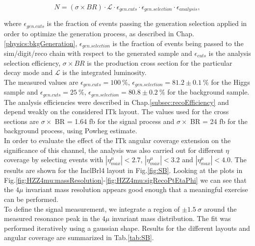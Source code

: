 \documentclass[a4paper,twoside,12pt]{book}
\begin{document}
\begin{equation*}
N = (\sigma \times BR)\cdot \mathcal{L}\cdot \epsilon_{gen. cuts}\cdot \epsilon_{gen. selection} \cdot \epsilon_{analysis},
\end{equation*}

where $\epsilon_{gen. cuts}$ is the fraction of events passing the generation selection applied in order to optimize the generation process, as described in Chap.\ref{physics:bkgGeneration}, 
$\epsilon_{gen. selection}$ is the fraction of events being passed to the sim/digit/reco chain with respect to the generated sample and $\epsilon_{cuts}$ is the 
analysis selection efficiency, $\sigma \times BR$ is the production cross section for the particular decay mode and $\mathcal{L}$ is the integrated luminosity. \\

The measured values are $\epsilon_{gen. cuts} = 100\ \%$, $\epsilon_{gen. selection} = 81.2 \pm 0.1\ \%$ for the Higgs sample and 
$\epsilon_{gen. cuts} = 25\ \%$, $\epsilon_{gen. selection} = 80.8 \pm 0.2\ \%$ for
the background sample. The analysis efficiencies were described in Chap.\ref{subsec:recoEfficiency} and depend weakly on the considered ITk layout. The values used for the cross sections are
$\sigma \times$ BR = 1.64 fb for the signal process and $\sigma \times$ BR = 24 fb for the background process, using Powheg\cite{Powheg} estimate.\\

In order to evaluate the effect of the ITk angular coverage extension on the significance of this channel, the analysis was also carried out for different $\eta$ coverage by selecting 
events with $|\eta^\mu_{max}| < 2.7$, $|\eta^\mu_{max}| < 3.2$ and $|\eta^\mu_{max}| < 4.0$. The results are shown for the InclBrl4 layout in Fig.\ref{fig:SB}. Looking at the plots in
Fig.\ref{fig:HZZ4mu:massResolution}-\ref{fig:HZZ4mu:sigRecoPtEtaPhi} we can see that the $4\mu$ invariant mass resolution appears good enough that a meaningful exercise can be performed. \\

To define the signal measurement, we integrate a region of $\pm 1.5\ \sigma$ around the measured resonance peak in the $4\mu$ invariant mass distribution. The fit was performed iteratively 
using a gaussian shape. Results for the different layouts and angular coverage are summarized in Tab.\ref{tab:SB}.
\end{document}
